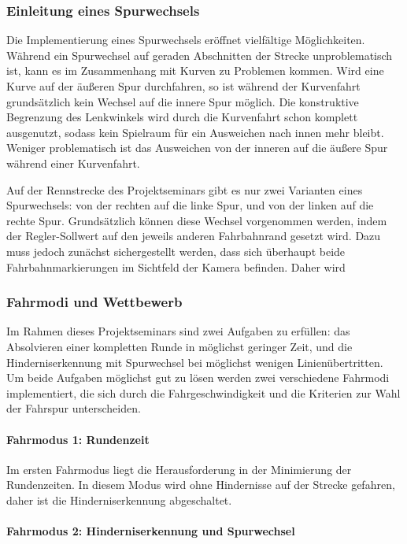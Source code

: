 \subsubsection{Einleitung eines Spurwechsels}
\label{sec:spurwechsel}
Die Implementierung eines Spurwechsels eröffnet vielfältige Möglichkeiten. Während ein Spurwechsel auf geraden Abschnitten der Strecke unproblematisch ist, kann es im Zusammenhang mit Kurven zu Problemen kommen. Wird eine Kurve auf der äußeren Spur durchfahren, so ist während der Kurvenfahrt grundsätzlich kein Wechsel auf die innere Spur möglich. Die konstruktive Begrenzung des Lenkwinkels wird durch die Kurvenfahrt schon komplett ausgenutzt, sodass kein Spielraum für ein Ausweichen nach innen mehr bleibt. Weniger problematisch ist das Ausweichen von der inneren auf die äußere Spur während einer Kurvenfahrt.

Auf der Rennstrecke des Projektseminars gibt es nur zwei Varianten eines Spurwechsels: von der rechten auf die linke Spur, und von der linken auf die rechte Spur. Grundsätzlich können diese Wechsel vorgenommen werden, indem der Regler-Sollwert auf den jeweils anderen Fahrbahnrand gesetzt wird. Dazu muss jedoch zunächst sichergestellt werden, dass sich überhaupt beide Fahrbahnmarkierungen im Sichtfeld der Kamera befinden. Daher wird 


\subsubsection{Fahrmodi und Wettbewerb}
\label{sec:fahrmodi}
Im Rahmen dieses Projektseminars sind zwei Aufgaben zu erfüllen: das Absolvieren einer kompletten Runde in möglichst geringer Zeit, und die Hinderniserkennung mit Spurwechsel bei möglichst wenigen Linienübertritten. Um beide Aufgaben möglichst gut zu lösen werden zwei verschiedene Fahrmodi implementiert, die sich durch die Fahrgeschwindigkeit und die Kriterien zur Wahl der Fahrspur unterscheiden.

\paragraph{Fahrmodus 1: Rundenzeit}


Im ersten Fahrmodus liegt die Herausforderung in der Minimierung der Rundenzeiten. In diesem Modus wird ohne Hindernisse auf der Strecke gefahren, daher ist die Hinderniserkennung abgeschaltet. 

\paragraph{Fahrmodus 2: Hinderniserkennung und Spurwechsel}


